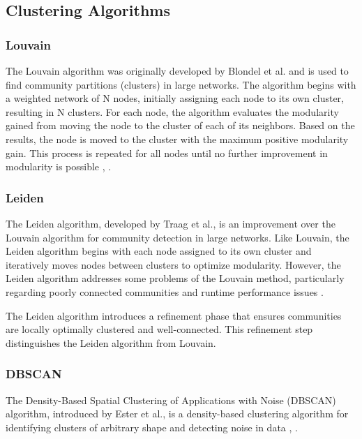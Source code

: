 \documentclass[12pt, a4paper, twoside]{report}
\begin{document}
\subsection{Clustering Algorithms}
\subsubsection{Louvain}
\label{subsubsec:louvain}

The Louvain algorithm was originally developed by Blondel et al. and is used to find community partitions (clusters) in large networks. The algorithm begins with a weighted network of N nodes, initially assigning each node to its own cluster, resulting in N clusters. For each node, the algorithm evaluates the modularity gained from moving the node to the cluster of each of its neighbors. Based on the results, the node is moved to the cluster with the maximum positive modularity gain. This process is repeated for all nodes until no further improvement in modularity is possible \cite{b8}, \cite{b9}.

\subsubsection{Leiden}
\label{subsubsec:leiden}

The Leiden algorithm, developed by Traag et al., is an improvement over the Louvain algorithm for community detection in large networks. Like Louvain, the Leiden algorithm begins with each node assigned to its own cluster and iteratively moves nodes between clusters to optimize modularity. However, the Leiden algorithm addresses some problems of the Louvain method, particularly regarding poorly connected communities and runtime performance issues \cite{leiden} \cite{scikit}.

The Leiden algorithm introduces a refinement phase that ensures communities are locally optimally clustered and well-connected. This refinement step distinguishes the Leiden algorithm from Louvain.


\subsubsection{DBSCAN}
\label{subsubsec:dbscan}

The Density-Based Spatial Clustering of Applications with Noise (DBSCAN) algorithm, introduced by Ester et al., is a density-based clustering algorithm for identifying clusters of arbitrary shape and detecting noise in data \cite{dbscan}, \cite{scikit}.
\end{document}
